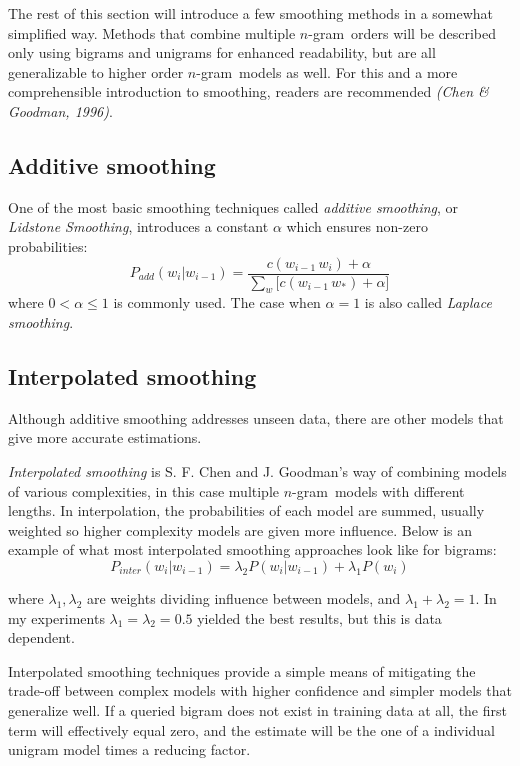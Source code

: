 \documentclass[a4paper,11pt]{kth-mag}
\newcommand{\ngram}{$n$-gram}
\begin{document}
The rest of this section will introduce a few smoothing methods in a somewhat simplified way.
Methods that combine multiple \ngram~orders will be described only using bigrams and
unigrams for enhanced readability,
but are all generalizable to higher order \ngram~models as well.
For this and a more comprehensible introduction to smoothing,
readers are recommended \emph{(Chen \& Goodman, 1996)}.

\subsection{Additive smoothing}
One of the most basic smoothing techniques called \emph{additive smoothing},
or \emph{Lidstone Smoothing}, introduces a constant $\alpha$ which ensures
non-zero probabilities\cite{chen_goodman}:
\begin{equation} \label{eq:additive_smoothing}
P_{add}(w_i|w_{i-1}) = \frac{c(w_{i-1}\,w_i)+\alpha}{\sum_{w} \big[c(w_{i-1}\, w_*)+\alpha\big]}
\end{equation}
where $0 < \alpha \leq 1$ is commonly used. The case when $\alpha=1$ is also called \emph{Laplace smoothing}\cite{nlp_book}.


\subsection{Interpolated smoothing}
Although additive smoothing addresses unseen data, there are other models that give more accurate estimations.

\emph{Interpolated smoothing} is S. F. Chen and J. Goodman's way of combining models of various complexities,
in this case multiple \ngram~models with different lengths. In interpolation, the probabilities of each model are summed, usually weighted so higher complexity models are given more influence\cite{chen_goodman}.
Below is an example of what most interpolated smoothing approaches look like for bigrams:
\begin{equation}\label{eq:interpolated_smoothing}
  P_{inter}(w_i|w_{i-1}) =
  \lambda_2 P(w_i|w_{i-1}) + \lambda_1 P(w_i)
\end{equation}

where $\lambda_1, \lambda_2$ are weights dividing influence between models, and $\lambda_1 + \lambda_2 = 1$.
In my experiments $\lambda_1 = \lambda_2 = 0.5$ yielded the best results, but this is data dependent.

Interpolated smoothing techniques provide a simple means of mitigating
the trade-off between complex models with higher confidence
and simpler models that generalize well.
If a queried bigram does not exist in training data at all,
the first term will effectively equal zero,
and the estimate will be the one of a individual unigram model times a reducing factor.
\end{document}
